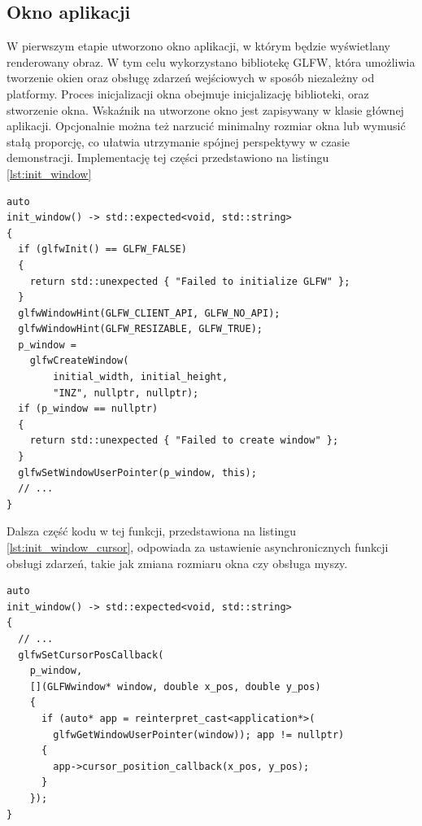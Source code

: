\subsection{Okno aplikacji}
W pierwszym etapie utworzono okno aplikacji, w którym będzie wyświetlany renderowany obraz. W tym celu wykorzystano bibliotekę GLFW, która umożliwia tworzenie okien oraz obsługę zdarzeń wejściowych w sposób niezależny od platformy. Proces inicjalizacji okna obejmuje inicjalizację biblioteki, oraz stworzenie okna. Wskaźnik na utworzone okno jest zapisywany w klasie głównej aplikacji. Opcjonalnie można też narzucić minimalny rozmiar okna lub wymusić stałą proporcję, co ułatwia utrzymanie spójnej perspektywy w czasie demonstracji. Implementację tej części przedstawiono na listingu \ref{lst:init_window}
\begin{lstlisting}[caption={Część kodu odpowiedzialna za inicjalizację okna}, label={lst:init_window}]
auto
init_window() -> std::expected<void, std::string>
{
  if (glfwInit() == GLFW_FALSE)
  {
    return std::unexpected { "Failed to initialize GLFW" };
  }
  glfwWindowHint(GLFW_CLIENT_API, GLFW_NO_API);
  glfwWindowHint(GLFW_RESIZABLE, GLFW_TRUE);
  p_window =
    glfwCreateWindow(
        initial_width, initial_height, 
        "INZ", nullptr, nullptr);
  if (p_window == nullptr)
  {
    return std::unexpected { "Failed to create window" };
  }
  glfwSetWindowUserPointer(p_window, this);
  // ...
}
\end{lstlisting}
Dalsza część kodu w tej funkcji, przedstawiona na listingu \ref{lst:init_window_cursor}, odpowiada za ustawienie asynchronicznych funkcji obsługi zdarzeń, takie jak zmiana rozmiaru okna czy obsługa myszy.
\begin{lstlisting}[caption={Dalsza część funkcji inicjalizującej okno - obsługa pozycji myszy}, label={lst:init_window_cursor}]
auto
init_window() -> std::expected<void, std::string>
{
  // ...
  glfwSetCursorPosCallback(
    p_window,
    [](GLFWwindow* window, double x_pos, double y_pos)
    {
      if (auto* app = reinterpret_cast<application*>(
        glfwGetWindowUserPointer(window)); app != nullptr)
      {
        app->cursor_position_callback(x_pos, y_pos);
      }
    });
}
\end{lstlisting}

